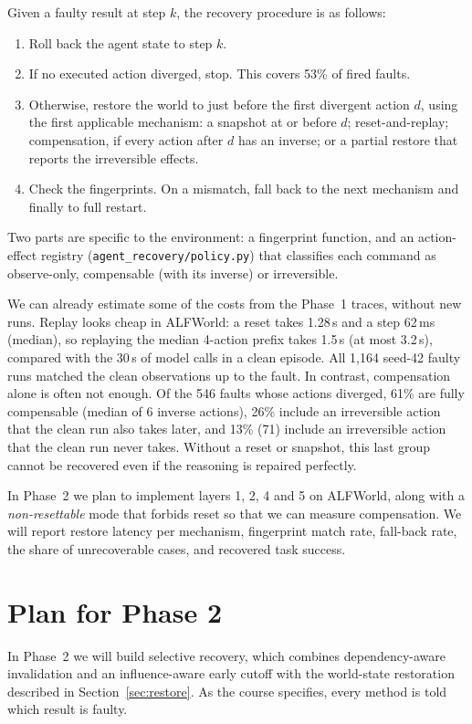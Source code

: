 \documentclass[10pt]{article}
\newcommand{\code}[1]{\texttt{\small #1}}
\begin{document}
Given a faulty result at step $k$, the recovery procedure is as follows:
\begin{enumerate}
\item Roll back the agent state to step $k$.
\item If no executed action diverged, stop. This covers 53\% of fired faults.
\item Otherwise, restore the world to just before the first divergent action $d$, using the
first applicable mechanism: a snapshot at or before $d$; reset-and-replay; compensation, if
every action after $d$ has an inverse; or a partial restore that reports the irreversible
effects.
\item Check the fingerprints. On a mismatch, fall back to the next mechanism and finally to
full restart.
\end{enumerate}
Two parts are specific to the environment: a fingerprint function, and an action-effect registry
(\code{agent\_recovery/policy.py}) that classifies each command as observe-only, compensable
(with its inverse) or irreversible.

We can already estimate some of the costs from the Phase~1 traces, without new runs. Replay looks
cheap in ALFWorld: a reset takes 1.28\,s and a step 62\,ms (median), so replaying the median
4-action prefix takes 1.5\,s (at most 3.2\,s), compared with the 30\,s of model calls in a clean
episode. All 1,164 seed-42 faulty runs matched the clean observations up to the fault. In contrast,
compensation alone is often not enough. Of the 546 faults whose actions diverged, 61\% are fully
compensable (median of 6 inverse actions), 26\% include an irreversible action that the clean run
also takes later, and 13\% (71) include an irreversible action that the clean run never takes.
Without a reset or snapshot, this last group cannot be recovered even if the reasoning is repaired
perfectly.

In Phase~2 we plan to implement layers 1, 2, 4 and 5 on ALFWorld, along with a \emph{non-resettable}
mode that forbids reset so that we can measure compensation. We will report restore latency per
mechanism, fingerprint match rate, fall-back rate, the share of unrecoverable cases, and recovered
task success.

\section{Plan for Phase 2}
In Phase~2 we will build selective recovery, which combines dependency-aware invalidation and an
influence-aware early cutoff with the world-state restoration described in
Section~\ref{sec:restore}. As the course specifies, every method is told which result is faulty.
\end{document}
